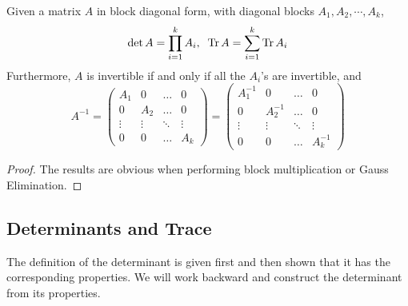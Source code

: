   \begin{theorem}
    \label{thm:determinant-and-trace-of-a-block-diagonal-matrix}
    Given a matrix $A$ in block diagonal form, with diagonal blocks $A_1, A_2, \cdots, A_k$,
    \begin{equation}
      \det{A} = \prod_{i=1}^k A_i, \; \; \operatorname{Tr}{A} = \sum_{i=1}^k \operatorname{Tr}{A_i}
    \end{equation}
    Furthermore, $A$ is invertible if and only if all the $A_i$'s are invertible, and 
    \begin{equation}
      A^{-1} = \begin{pmatrix}
      A_1&0&\ldots&0\\
      0&A_2&\ldots&0\\
      \vdots&\vdots&\ddots&\vdots\\
      0&0&\ldots&A_k
      \end{pmatrix} = \begin{pmatrix}
      A_1^{-1}&0&\ldots&0\\
      0&A_2^{-1}&\ldots&0\\
      \vdots&\vdots&\ddots&\vdots\\
      0&0&\ldots&A_k^{-1}
      \end{pmatrix}
    \end{equation}
  \end{theorem}
  \begin{proof}
    The results are obvious when performing block multiplication or Gauss Elimination. 
  \end{proof}

\subsection{Determinants and Trace}

  The definition of the determinant is given first and then shown that it has the corresponding properties. We will work backward and construct the determinant from its properties. 

